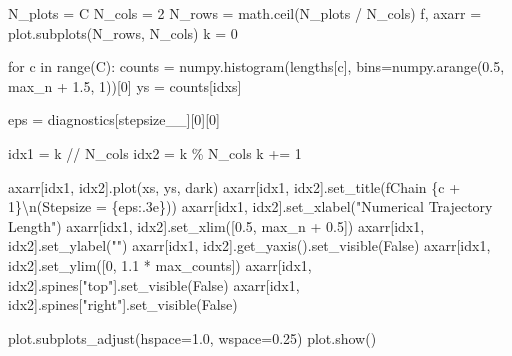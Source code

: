 \documentclass[
  letterpaper,
  DIV=11,
  numbers=noendperiod]{scrartcl}
\newenvironment{Shaded}{\begin{snugshade}}{\end{snugshade}}
\newcommand{\BuiltInTok}[1]{\textcolor[rgb]{0.00,0.23,0.31}{#1}}
\newcommand{\CharTok}[1]{\textcolor[rgb]{0.13,0.47,0.30}{#1}}
\newcommand{\ControlFlowTok}[1]{\textcolor[rgb]{0.00,0.23,0.31}{#1}}
\newcommand{\DecValTok}[1]{\textcolor[rgb]{0.68,0.00,0.00}{#1}}
\newcommand{\FloatTok}[1]{\textcolor[rgb]{0.68,0.00,0.00}{#1}}
\newcommand{\KeywordTok}[1]{\textcolor[rgb]{0.00,0.23,0.31}{#1}}
\newcommand{\NormalTok}[1]{\textcolor[rgb]{0.00,0.23,0.31}{#1}}
\newcommand{\OperatorTok}[1]{\textcolor[rgb]{0.37,0.37,0.37}{#1}}
\newcommand{\SpecialCharTok}[1]{\textcolor[rgb]{0.37,0.37,0.37}{#1}}
\newcommand{\SpecialStringTok}[1]{\textcolor[rgb]{0.13,0.47,0.30}{#1}}
\newcommand{\StringTok}[1]{\textcolor[rgb]{0.13,0.47,0.30}{#1}}
\newcommand{\VariableTok}[1]{\textcolor[rgb]{0.07,0.07,0.07}{#1}}
\begin{document}
\begin{Shaded}
\begin{Highlighting}[]
\NormalTok{  N\_plots }\OperatorTok{=}\NormalTok{ C}
\NormalTok{  N\_cols }\OperatorTok{=} \DecValTok{2}
\NormalTok{  N\_rows }\OperatorTok{=}\NormalTok{ math.ceil(N\_plots }\OperatorTok{/}\NormalTok{ N\_cols)}
\NormalTok{  f, axarr }\OperatorTok{=}\NormalTok{ plot.subplots(N\_rows, N\_cols)}
\NormalTok{  k }\OperatorTok{=} \DecValTok{0}
  
  \ControlFlowTok{for}\NormalTok{ c }\KeywordTok{in} \BuiltInTok{range}\NormalTok{(C):}
\NormalTok{    counts }\OperatorTok{=}\NormalTok{ numpy.histogram(lengths[c], }
\NormalTok{                             bins}\OperatorTok{=}\NormalTok{numpy.arange(}\FloatTok{0.5}\NormalTok{, max\_n }\OperatorTok{+} \FloatTok{1.5}\NormalTok{, }\DecValTok{1}\NormalTok{))[}\DecValTok{0}\NormalTok{]}
\NormalTok{    ys }\OperatorTok{=}\NormalTok{ counts[idxs]}
    
\NormalTok{    eps }\OperatorTok{=}\NormalTok{ diagnostics[}\StringTok{\textquotesingle{}stepsize\_\_\textquotesingle{}}\NormalTok{][}\DecValTok{0}\NormalTok{][}\DecValTok{0}\NormalTok{]}
    
\NormalTok{    idx1 }\OperatorTok{=}\NormalTok{ k }\OperatorTok{//}\NormalTok{ N\_cols}
\NormalTok{    idx2 }\OperatorTok{=}\NormalTok{ k }\OperatorTok{\%}\NormalTok{ N\_cols}
\NormalTok{    k }\OperatorTok{+=} \DecValTok{1}
    
\NormalTok{    axarr[idx1, idx2].plot(xs, ys, dark)}
\NormalTok{    axarr[idx1, idx2].set\_title(}\SpecialStringTok{f\textquotesingle{}Chain }\SpecialCharTok{\{}\NormalTok{c }\OperatorTok{+} \DecValTok{1}\SpecialCharTok{\}}\CharTok{\textbackslash{}n}\SpecialStringTok{(Stepsize = }\SpecialCharTok{\{}\NormalTok{eps}\SpecialCharTok{:.3e\}}\SpecialStringTok{)\textquotesingle{}}\NormalTok{)}
\NormalTok{    axarr[idx1, idx2].set\_xlabel(}\StringTok{"Numerical Trajectory Length"}\NormalTok{)}
\NormalTok{    axarr[idx1, idx2].set\_xlim([}\FloatTok{0.5}\NormalTok{, max\_n }\OperatorTok{+} \FloatTok{0.5}\NormalTok{])}
\NormalTok{    axarr[idx1, idx2].set\_ylabel(}\StringTok{""}\NormalTok{)}
\NormalTok{    axarr[idx1, idx2].get\_yaxis().set\_visible(}\VariableTok{False}\NormalTok{)}
\NormalTok{    axarr[idx1, idx2].set\_ylim([}\DecValTok{0}\NormalTok{, }\FloatTok{1.1} \OperatorTok{*}\NormalTok{ max\_counts])}
\NormalTok{    axarr[idx1, idx2].spines[}\StringTok{"top"}\NormalTok{].set\_visible(}\VariableTok{False}\NormalTok{)}
\NormalTok{    axarr[idx1, idx2].spines[}\StringTok{"right"}\NormalTok{].set\_visible(}\VariableTok{False}\NormalTok{)}
  
\NormalTok{  plot.subplots\_adjust(hspace}\OperatorTok{=}\FloatTok{1.0}\NormalTok{, wspace}\OperatorTok{=}\FloatTok{0.25}\NormalTok{)}
\NormalTok{  plot.show()}
\end{Highlighting}
\end{Shaded}
\end{document}
